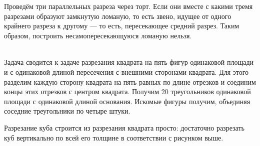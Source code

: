 \begin{itemize}

\itA Проведём три параллельных разреза через торт. Если они вместе с какими тремя разрезами образуют замкнутую ломаную, то есть звено, идущее от одного крайнего разреза к другому — то есть, пересекающее средний разрез. Таким образом, построить несамопересекающуюся ломаную нельзя.

\itB $\phantom{x}$
\vspace{-0.5cm}
\begin{center}\end{center}
\vspace{0.2cm}

\itC Задача сводится к задаче разрезания квадрата на пять фигур одинаковой площади и с одинаковой длиной пересечения с внешними сторонами квадрата. Для этого разделим каждую сторону квадрата на пять равных по длине отрезков и соединим концы этих отрезков с центром квадрата. Получим 20 треугольников одинаковой площади с одинаковой длиной основания. Искомые фигуры получим, объединяя соседние треугольники по четыре штуки.

\medskip
\begin{center}  \end{center}

Разрезание куба строится из разрезания квадрата просто: достаточно разрезать куб вертикально по всей его толщине в соответствии с рисунком выше.
\end{itemize}
